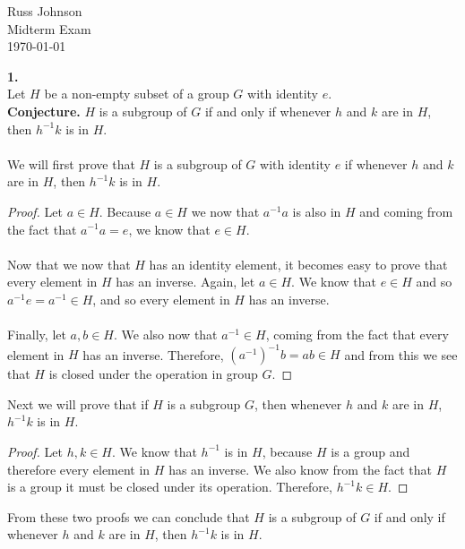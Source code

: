 \documentclass[11pt,a4paper]{article}
\begin{document}
\begin{flushright}
Russ Johnson\\
Midterm Exam\\
\today\\
\end{flushright}

{\bf 1.}\\
Let $H$ be a non-empty subset of a group $G$ with identity $e$.\\
{\bf Conjecture.} $H$ is a subgroup of $G$ if and only if whenever $h$ and $k$ are in $H$, then $h^{-1}k$ is in $H$.\\
~\\
We will first prove that $H$ is a subgroup of $G$ with identity $e$ if whenever $h$ and $k$ are in $H$, then $h^{-1}k$ is in $H$.
\begin{proof}
Let $a\in H$. Because $a\in H$ we now that $a^{-1}a$ is also in $H$ and coming from the fact that $a^{-1}a = e$, we know that $e\in H$.\\
~\\
Now that we now that $H$ has an identity element, it becomes easy to prove that every element in $H$ has an inverse. Again, let $a\in H$. We know that $e\in H$ and so $a^{-1}e = a^{-1} \in H$, and so every element in $H$ has an inverse.\\
~\\
Finally, let $a,b \in H$. We also now that $a^{-1}\in H$, coming from the fact that every element in $H$ has an inverse. Therefore, $(a^{-1})^{-1}b = ab\in H$ and from this we see that $H$ is closed under the operation in group $G$.
\end{proof}

Next we will prove that if $H$ is a subgroup $G$, then whenever $h$ and $k$ are in $H$, $h^{-1}k$ is in $H$.

\begin{proof}
Let $h,k\in H$. We know that $h^{-1}$ is in $H$, because $H$ is a group and therefore every element in $H$ has an inverse. We also know from the fact that $H$ is a group it must be closed under its operation. Therefore, $h^{-1}k \in H$.
\end{proof} 

From these two proofs we can conclude that $H$ is a subgroup of $G$ if and only if whenever $h$ and $k$ are in $H$, then $h^{-1}k$ is in $H$.\\
\end{document}
